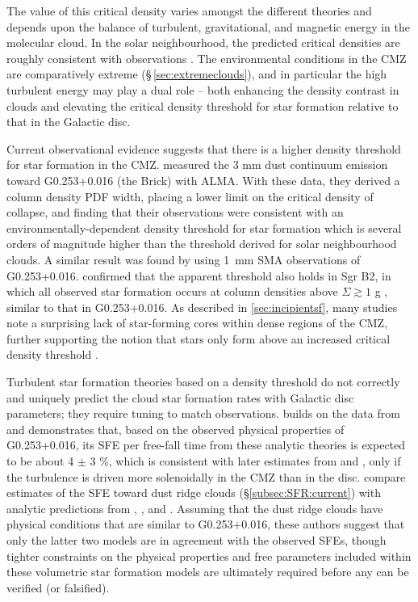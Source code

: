 The value of this critical density varies amongst the different theories and depends upon the balance of turbulent, gravitational, and magnetic energy in the molecular cloud. 
In the solar neighbourhood, the predicted critical densities \citep[e.g.][]{Padoan2014} are roughly consistent with observations \citep[e.g.][]{Lada2010}.
The environmental conditions in the CMZ are comparatively extreme (\S\,\ref{sec:extremeclouds}), and in particular the high turbulent energy may play a dual role -- both enhancing the density contrast in clouds and elevating the critical density threshold for star formation \citep[e.g.\ ][]{Kruijssen2014a, Burkhart2019} relative to that in the Galactic disc. 

Current observational evidence suggests that there is a higher density threshold for star formation in the CMZ.
\citet{Rathborne2014b, Rathborne2015} measured the 3 mm dust continuum emission toward G0.253+0.016 (the Brick) with ALMA. With these data, they derived a column density PDF width, placing a lower limit on the critical density of collapse, and finding that their observations were consistent with an environmentally-dependent density threshold for star formation which is several orders of magnitude higher than the threshold derived for solar neighbourhood clouds. A similar result was found by \citet{Johnston2014} using 1~mm SMA observations of G0.253+0.016. \citet{Ginsburg2018b} confirmed that the apparent threshold also holds in Sgr B2, in which all observed star formation occurs at column densities above $\Sigma\gtrsim1$ g \persc, similar to that in G0.253+0.016. 
As described in \ref{sec:incipientsf}, many studies note a surprising lack of star-forming cores within dense regions of the CMZ, further supporting the notion that stars only form above an increased critical density threshold \citep{Kauffmann2013, Kauffmann2017a, Walker2018, Barnes2019, Lu2019b, Lu2020, Battersby2020}.

Turbulent star formation theories based on a density threshold do not correctly and uniquely predict the cloud star formation rates with Galactic disc parameters; they require tuning to match observations.
\citet{Federrath2016} builds on the data from \citet{Rathborne2014b} and demonstrates that, based on the observed physical properties of G0.253+0.016, its SFE per free-fall time from these analytic theories is expected to be about 4 $\pm$ 3 \%, which is consistent with later estimates from \citet{Kauffmann2017a} and \citet{Barnes2017}, only if the turbulence is driven more solenoidally in the CMZ than in the disc.
\citet{Barnes2017} compare estimates of the SFE toward dust ridge clouds (\S\ref{subsec:SFR:current}) with analytic predictions from \citet{Krumholz2005}, \citet{Padoan2011}, and \citet{ Hennebelle2013}.
Assuming that the dust ridge clouds have physical conditions that are similar to G0.253+0.016, these authors suggest that only the latter two models are in agreement with the observed SFEs, though tighter constraints on the physical properties and free parameters included within these volumetric star formation models are ultimately required before any can be verified (or falsified).

